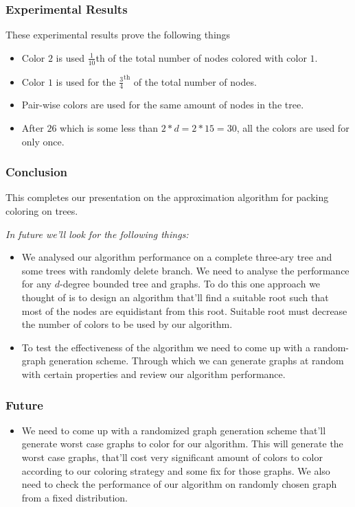 \begin{frame}
    \frametitle{Experimental Results}

    These experimental results prove the following things

    \pause[]


    \begin{itemize}
        \item Color $2$ is used $\frac{1}{10}$th of the total number of nodes colored with color $1$.\pause[]
        \item Color $1$ is used for the $\frac{3}{4}^{\text{th}}$ of the total number of nodes.\pause[]
        \item Pair-wise colors are used for the same amount of nodes in the tree.\pause[]
        \item After $26$ which is some less than $2*d = 2*15 = 30$, all the colors are used for only once.
    \end{itemize}

\end{frame}

\begin{frame}
    \frametitle{Conclusion}

    This completes our presentation on the approximation algorithm for packing coloring on trees.

    \pause[]

    \textit{In future we'll look for the following things:}\pause[]
    
    \begin{itemize}
        \item We analysed our algorithm performance on a complete three-ary tree and some trees with randomly delete branch. We need to analyse the performance for any $d$-degree bounded tree and graphs. To do this one approach we thought of is to design an algorithm that'll find a suitable root such that most of the nodes are equidistant from this root. Suitable root must decrease the number of colors to be used by our algorithm.\pause[]
        \item To test the effectiveness of the algorithm we need to come up with a random-graph generation scheme. Through which we can generate graphs at random with certain properties and review our algorithm performance.\pause[]
    \end{itemize}
    
\end{frame}

\begin{frame}
    \frametitle{Future}


    \begin{itemize}
        \item We need to come up with a randomized graph generation scheme that'll generate worst case graphs to color for our algorithm. This will generate the worst case graphs, that'll cost very significant amount of colors to color according to our coloring strategy and some fix for those graphs. We also need to check the performance of our algorithm on randomly chosen graph from a fixed distribution.
    \end{itemize}

\end{frame}

